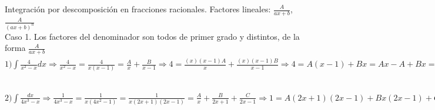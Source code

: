 \documentclass[12pt]{report}
\begin{document}
    \hfill \break
    Integración por descomposición en fracciones racionales. Factores lineales: $\frac{A}{ax + b}$, $\frac{A}{(ax + b)^n}$ \\
    Caso 1. Los factores del denominador son todos de primer grado y distintos, de la forma $\frac{A}{ax + b}$ \\
    $1) \int\frac{4}{x^2-x}dx \Rightarrow \frac{4}{x^2-x} = \frac{4}{x(x-1)} = \frac{A}{x}+\frac{B}{x-1} \Rightarrow 4 = \frac{(x)(x-1)A}{x} +\frac{(x)(x-1)B}{x-1} \Rightarrow 4 = A(x-1) + Bx = Ax - A + Bx = x(A + B) - A \Rightarrow 
    \begin{bmatrix}
        1 & 1 & 0\\
        -1 & 0 & 4
    \end{bmatrix}
    \Rightarrow -A = 4 \Rightarrow \boxed{A = -4} \Rightarrow A + B = 0 \Rightarrow - 4 + B = 0 \Rightarrow \boxed{B = 4} \Longrightarrow \frac{4}{x^2-x} = \frac{-4}{x} + \frac{4}{x-1} \Longrightarrow I = \int\frac{4}{x^2-x}dx = \int\frac{-4}{x} + \int\frac{4}{x-1}dx = -4\ln x + 4\ln(x-1) + C = 4[\ln(x-1) - \ln x] + C = \boxed{\ln(\frac{x-1}{x})^4 + C}$ 

    $2) \int\frac{dx}{4x^3-x} \Rightarrow \frac{1}{4x^3-x} = \frac{1}{x(4x^2-1)} = \frac{1}{x(2x+1)(2x-1)} = \frac{A}{x} + \frac{B}{2x+1} + \frac{C}{2x-1} \Rightarrow 1 = A(2x+1)(2x-1) + Bx(2x-1) + Cx(2x+1) = A(4x^2-1) + B(2x^2-x) + C(2x^2+x) \Rightarrow 1 = x^2(4A + 2B + 2C) + x(-B + C) - A \Rightarrow 
    \begin{bmatrix}
        -1 & 0 & 0 & 1 \\
        0 & -1 & 1 & 0 \\
        4 & 2 & 2 & 0 \\
    \end{bmatrix} \sim 4R_1 + R_3\sim 
    \begin{bmatrix}
        -1 & 0 & 0 & 1 \\
        0 & -1 & 1 & 0 \\
        0 & 2 & 2 & 4 \\
    \end{bmatrix} \sim \frac{1}{2}R_3\sim 
    \begin{bmatrix}
        -1 & 0 & 0 & 1 \\
        0 & -1 & 1 & 0 \\
        0 & 1 & 1 & 2 \\
    \end{bmatrix} \sim R_3 + R_2\sim 
    \begin{bmatrix}
        -1 & 0 & 0 & 1 \\
        0 & 0 & 2 & 2 \\
        0 & 1 & 1 & 2 \\
    \end{bmatrix}
    \Rightarrow 2C = 2 \Rightarrow \boxed{C = 1} \Rightarrow B + C = 2 \Rightarrow B + 1 = 2 \Rightarrow \boxed{B = 1} \Rightarrow -A = 1 \Rightarrow \boxed{A = -1} \Longrightarrow \int\frac{-1}{x}dx + \int\frac{1}{2x+1}dx + \int\frac{1}{2x-1}dx = -\ln x + \frac{1}{2}\ln(2x+1) + \frac{1}{2}\ln(2x-1) + C = \boxed{\ln\frac{\sqrt{(4x^2-1)}}{x} + C}$
\end{document}
